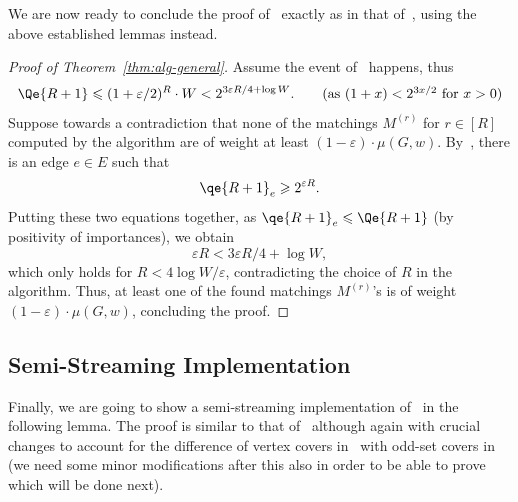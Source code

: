 \documentclass{theoretics}
\renewcommand{\leq}{\leqslant}
\renewcommand{\geq}{\geqslant}
\newcommand{\eps}{\varepsilon}
\begin{document}
We are now ready to conclude the proof of~ exactly as in that of~, using the above established lemmas instead. 

\begin{proof}[Proof of Theorem~\ref{thm:alg-general}]
	Assume the  event of~ happens, thus
	\begin{align*}
		\Qe{R+1} \leq (1+\eps/2)^{R} \cdot W < 2^{3\eps R/4 + \log{W}}. \tag{as $(1+x) < 2^{3x/2}$ for $x > 0$} 
	\end{align*}
	Suppose towards a contradiction that none of the matchings $M^{(r)}$ for $r \in [R]$ computed by the algorithm
	are of weight at least $(1-\eps) \cdot \mu(G,w)$. By~, there is an edge $e \in E$ such that 
	\[
		\qe{R+1}_e \geq 2^{\eps R}. 
	\]
	Putting these two equations together, as $\qe{R+1}_e \leq \Qe{R+1}$ (by positivity of importances), we obtain 
	\[
		\eps R < 3\eps R/4 + \log{W}, 
	\]
	which only holds for $R < 4\log{W}/\eps$, contradicting the choice of $R$ in the algorithm. Thus, at least one of the found matchings $M^{(r)}$'s is of weight $(1-\eps) \cdot \mu(G,w)$, 
	concluding the proof.
\end{proof}


\subsection*{Semi-Streaming Implementation}%

Finally, we are going to show a semi-streaming implementation of~ in the following lemma. 
The proof is similar to that of~ although again with crucial changes to account for the difference of vertex covers in~ with odd-set covers in~ (we need some minor 
modifications after this also in order to be able to prove~ which will be done next). 
\end{document}
